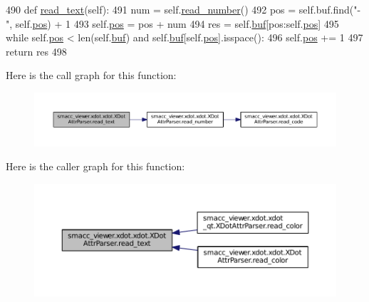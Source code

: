 \begin{DoxyCode}
490     \textcolor{keyword}{def }\hyperlink{classsmacc__viewer_1_1xdot_1_1xdot_1_1XDotAttrParser_a1a80138dcda0594956369bb57b3ff45e}{read\_text}(self):
491         num = self.\hyperlink{classsmacc__viewer_1_1xdot_1_1xdot_1_1XDotAttrParser_a3cd5d75659572a2deec8a81b677eb9ab}{read\_number}()
492         pos = self.buf.find(\textcolor{stringliteral}{"-"}, self.\hyperlink{classsmacc__viewer_1_1xdot_1_1xdot_1_1XDotAttrParser_a4e3d002256eadbd59bda22fc62660cf6}{pos}) + 1
493         self.\hyperlink{classsmacc__viewer_1_1xdot_1_1xdot_1_1XDotAttrParser_a4e3d002256eadbd59bda22fc62660cf6}{pos} = pos + num
494         res = self.\hyperlink{classsmacc__viewer_1_1xdot_1_1xdot_1_1XDotAttrParser_a40fb437711b231cb2d0fed77106edc2f}{buf}[pos:self.\hyperlink{classsmacc__viewer_1_1xdot_1_1xdot_1_1XDotAttrParser_a4e3d002256eadbd59bda22fc62660cf6}{pos}]
495         \textcolor{keywordflow}{while} self.\hyperlink{classsmacc__viewer_1_1xdot_1_1xdot_1_1XDotAttrParser_a4e3d002256eadbd59bda22fc62660cf6}{pos} < len(self.\hyperlink{classsmacc__viewer_1_1xdot_1_1xdot_1_1XDotAttrParser_a40fb437711b231cb2d0fed77106edc2f}{buf}) \textcolor{keywordflow}{and} self.\hyperlink{classsmacc__viewer_1_1xdot_1_1xdot_1_1XDotAttrParser_a40fb437711b231cb2d0fed77106edc2f}{buf}[self.\hyperlink{classsmacc__viewer_1_1xdot_1_1xdot_1_1XDotAttrParser_a4e3d002256eadbd59bda22fc62660cf6}{pos}].isspace():
496             self.\hyperlink{classsmacc__viewer_1_1xdot_1_1xdot_1_1XDotAttrParser_a4e3d002256eadbd59bda22fc62660cf6}{pos} += 1
497         \textcolor{keywordflow}{return} res
498 
\end{DoxyCode}


Here is the call graph for this function\+:
\nopagebreak
\begin{figure}[H]
\begin{center}
\leavevmode
\includegraphics[width=350pt]{classsmacc__viewer_1_1xdot_1_1xdot_1_1XDotAttrParser_a1a80138dcda0594956369bb57b3ff45e_cgraph}
\end{center}
\end{figure}




Here is the caller graph for this function\+:
\nopagebreak
\begin{figure}[H]
\begin{center}
\leavevmode
\includegraphics[width=350pt]{classsmacc__viewer_1_1xdot_1_1xdot_1_1XDotAttrParser_a1a80138dcda0594956369bb57b3ff45e_icgraph}
\end{center}
\end{figure}


